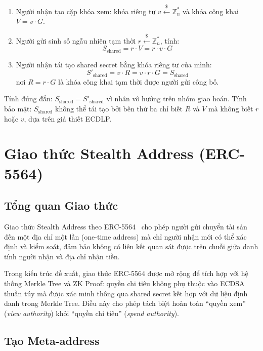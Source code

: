 \documentclass[../DoAn.tex]{subfiles}
\begin{document}
\begin{enumerate}
    \item Người nhận tạo cặp khóa xem: khóa riêng tư \(v \xleftarrow{\$} \mathbb{Z}_n^*\) và khóa công khai \(V = v \cdot G\).
    \item Người gửi sinh số ngẫu nhiên tạm thời \(r \xleftarrow{\$} \mathbb{Z}_n^*\), tính:
    \[
        S_{\text{shared}} = r \cdot V = r \cdot v \cdot G
    \]
    \item Người nhận tái tạo shared secret bằng khóa riêng tư của mình:
    \[
        S'_{\text{shared}} = v \cdot R = v \cdot r \cdot G = S_{\text{shared}}
    \]
    nơi \(R = r \cdot G\) là khóa công khai tạm thời được người gửi công bố.
\end{enumerate}

Tính đúng đắn: \(S_{\text{shared}} = S'_{\text{shared}}\) vì nhân vô hướng trên nhóm giao hoán. Tính bảo mật: \(S_{\text{shared}}\) không thể tái tạo bởi bên thứ ba chỉ biết \(R\) và \(V\) mà không biết \(r\) hoặc \(v\), dựa trên giả thiết ECDLP.

\section{Giao thức Stealth Address (ERC-5564)}

\subsection{Tổng quan Giao thức}
\label{subsec:stealth_protocol}

Giao thức Stealth Address theo ERC-5564~\cite{erc5564} cho phép người gửi chuyển tài sản đến một địa chỉ một lần (one-time address) mà chỉ người nhận mới có thể xác định và kiểm soát, đảm bảo không có liên kết quan sát được trên chuỗi giữa danh tính người nhận và địa chỉ nhận tiền.

Trong kiến trúc đề xuất, giao thức ERC-5564 được mở rộng để tích hợp với hệ thống Merkle Tree và ZK Proof: quyền chi tiêu không phụ thuộc vào ECDSA thuần túy mà được xác minh thông qua shared secret kết hợp với dữ liệu định danh trong Merkle Tree. Điều này cho phép tách biệt hoàn toàn ``quyền xem'' (\textit{view authority}) khỏi ``quyền chi tiêu'' (\textit{spend authority}).

\subsection{Tạo Meta-address}
\label{subsec:meta_address}
\end{document}
